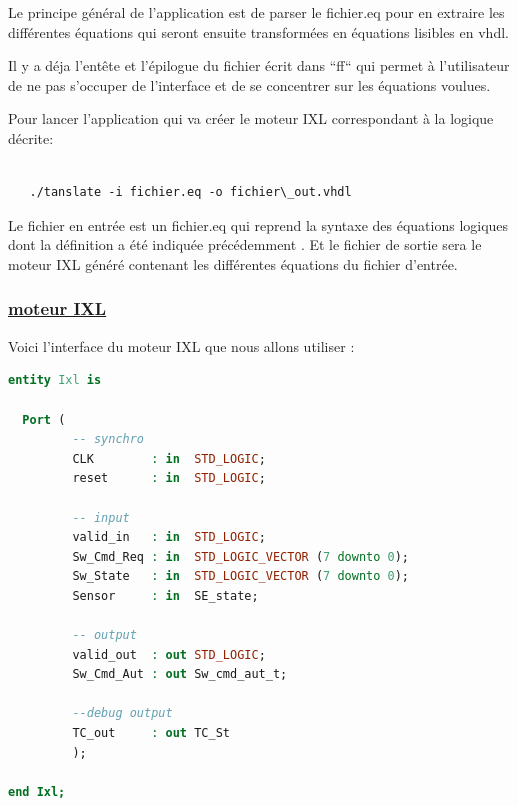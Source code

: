 \medskip

Le principe général de l'application est de parser le fichier.eq pour
en extraire les différentes équations qui seront ensuite transformées en
équations lisibles en vhdl.

\medskip

Il y a déja l'entête et l'épilogue du fichier écrit dans ``ff`` qui
permet à l'utilisateur de ne pas s'occuper de l'interface et de se
concentrer sur les équations voulues.

\medskip

Pour lancer l'application qui va créer le moteur IXL correspondant à la logique décrite:

\begin{lstlisting}

   ./tanslate -i fichier.eq -o fichier\_out.vhdl

\end{lstlisting}




Le fichier en entrée est un fichier.eq qui reprend la syntaxe des
équations logiques dont la définition a été indiquée précédemment  \cite{}.
Et le fichier de sortie sera le moteur IXL généré contenant les
différentes équations du fichier d'entrée.

\newpage

\subsubsection{\underline{moteur IXL}}
\label{sec:IXL}

Voici l'interface du moteur IXL que nous allons utiliser :

\begin{lstlisting}[language=vhdl]
entity Ixl is  

  Port (
         -- synchro   
         CLK        : in  STD_LOGIC;
         reset      : in  STD_LOGIC;

         -- input
         valid_in   : in  STD_LOGIC; 
         Sw_Cmd_Req : in  STD_LOGIC_VECTOR (7 downto 0);
         Sw_State   : in  STD_LOGIC_VECTOR (7 downto 0);
         Sensor     : in  SE_state;
         
         -- output
         valid_out  : out STD_LOGIC;
         Sw_Cmd_Aut : out Sw_cmd_aut_t;

         --debug output
         TC_out     : out TC_St
         );

end Ixl;

\end{lstlisting}


